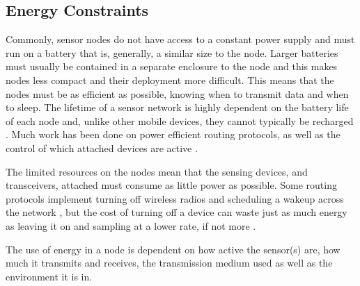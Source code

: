 \subsection{Energy Constraints}
	 Commonly, sensor nodes do not have access to a constant power supply and must run on a battery that is, generally, a similar size to the node. Larger batteries must usually be contained in a separate enclosure to the node and this makes nodes less compact and their deployment more difficult. This means that the nodes must be as efficient as possible, knowing when to transmit data and when to sleep. The lifetime of a sensor network is highly dependent on the battery life of each node and, unlike other mobile devices, they cannot typically be recharged \cite{Akyildiz2002}. Much work has been done on power efficient routing protocols, as well as the control of which attached devices are active \cite{Hempstead2005, Schurgers, Segal2010a}. 

	The limited resources on the nodes mean that the sensing devices, and transceivers, attached must consume as little power as possible. Some routing protocols implement turning off wireless radios and scheduling a wakeup across the network \cite{Vaidya2004}, but the cost of turning off a device can waste just as much energy as leaving it on and sampling at a lower rate, if not more \cite{Estrin2001}.

	The use of energy in a node is dependent on how active the sensor(s) are, how much it transmits and receives, the transmission medium used as well as the environment it is in.

